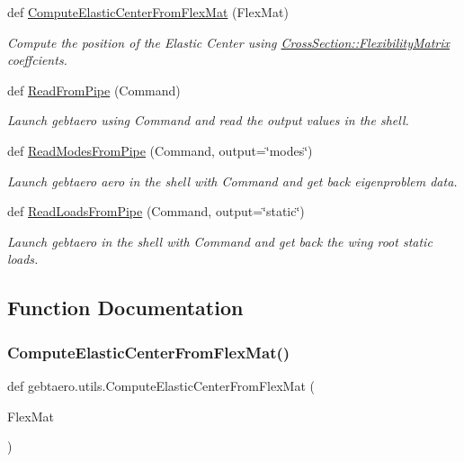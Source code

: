 \begin{DoxyCompactItemize}
def \hyperlink{namespacegebtaero_1_1utils_ac3a921856ec921436caee59af0838d06}{Compute\+Elastic\+Center\+From\+Flex\+Mat} (Flex\+Mat)
\begin{DoxyCompactList}\small\item\em Compute the position of the Elastic Center using \hyperlink{classgebtaero_1_1_cross_section_1_1_cross_section_ac20eafaf38ff757f9a8c9ae89212396a}{Cross\+Section\+::\+Flexibility\+Matrix} coeffcients. \end{DoxyCompactList}\item 
def \hyperlink{namespacegebtaero_1_1utils_ad35c5461b34c42fdf3fb6abb8c21a46d}{Read\+From\+Pipe} (Command)
\begin{DoxyCompactList}\small\item\em Launch gebtaero using Command and read the output values in the shell. \end{DoxyCompactList}\item 
def \hyperlink{namespacegebtaero_1_1utils_a79bf2fa9cdad677abf70cacde7abcf9e}{Read\+Modes\+From\+Pipe} (Command, output=\char`\"{}modes\char`\"{})
\begin{DoxyCompactList}\small\item\em Launch gebtaero aero in the shell with Command and get back eigenproblem data. \end{DoxyCompactList}\item 
def \hyperlink{namespacegebtaero_1_1utils_ad2812937cff40c12f0af963ab0b429b6}{Read\+Loads\+From\+Pipe} (Command, output=\char`\"{}static\char`\"{})
\begin{DoxyCompactList}\small\item\em Launch gebtaero in the shell with Command and get back the wing root static loads. \end{DoxyCompactList}\end{DoxyCompactItemize}


\subsection{Function Documentation}
\mbox{\label{namespacegebtaero_1_1utils_ac3a921856ec921436caee59af0838d06}} 
\subsubsection{\texorpdfstring{Compute\+Elastic\+Center\+From\+Flex\+Mat()}{ComputeElasticCenterFromFlexMat()}}
{\footnotesize\ttfamily def gebtaero.\+utils.\+Compute\+Elastic\+Center\+From\+Flex\+Mat (\begin{DoxyParamCaption}\item[{}]{Flex\+Mat }\end{DoxyParamCaption})}



